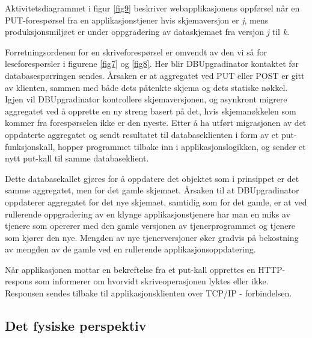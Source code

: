 Aktivitetsdiagrammet i figur \ref{fig9} beskriver webapplikasjonens oppførsel når en PUT-forespørsel fra en applikasjonstjener hvis skjemaversjon er \emph{j}, mens produksjonsmiljøet er under oppgradering av dataskjemaet fra versjon \emph{j} til \emph{k}.

Forretningsordenen for en skriveforespørsel er omvendt av den vi så for leseforespørsler i figurene \ref{fig7} og \ref{fig8}. Her blir DBUpgradinator kontaktet før databasespørringen sendes. Årsaken er at aggregatet ved PUT eller POST er gitt av klienten, sammen med både dets påtenkte skjema og dets statiske nøkkel. Igjen vil DBUpgradinator kontrollere skjemaversjonen, og asynkront migrere aggregatet ved å opprette en ny streng basert på det, hvis skjemanøkkelen som kommer fra forespørselen ikke er den nyeste. Etter å ha utført migrasjonen av det oppdaterte aggregatet og sendt resultatet til databaseklienten i form av et put-funksjonskall, hopper programmet tilbake inn i applikasjonslogikken, og sender et nytt put-kall til samme databaseklient.

Dette databasekallet gjøres for å oppdatere det objektet som i prinsippet er det samme aggregatet, men for det gamle skjemaet. Årsaken til at DBUpgradinator oppdaterer aggregatet for det nye skjemaet, samtidig som for det gamle, er at ved rullerende oppgradering av en klynge applikasjonstjenere har man en miks av tjenere som opererer med den gamle versjonen av tjenerprogrammet og tjenere som kjører den nye. Mengden av nye tjenerversjoner øker gradvis på bekostning av mengden av de gamle ved en rullerende applikasjonsoppdatering.

Når applikasjonen mottar en bekreftelse fra et put-kall opprettes en HTTP-respons som informerer om hvorvidt skriveoperasjonen lyktes eller ikke. Responsen sendes tilbake til applikasjonsklienten over TCP/IP - forbindelsen.

\subsection{Det fysiske perspektiv} \label{testenvironment}

